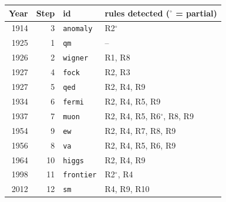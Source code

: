 \begin{tabular}{@{}rrlp{7cm}@{}}\toprule
Year & Step & id & rules detected ($^{\circ}$ = partial) \\\midrule
1914 & 3 & \texttt{anomaly} & R2$^{\circ}$ \\
1925 & 1 & \texttt{qm} & -- \\
1926 & 2 & \texttt{wigner} & R1, R8 \\
1927 & 4 & \texttt{fock} & R2, R3 \\
1927 & 5 & \texttt{qed} & R2, R4, R9 \\
1934 & 6 & \texttt{fermi} & R2, R4, R5, R9 \\
1937 & 7 & \texttt{muon} & R2, R4, R5, R6$^{\circ}$, R8, R9 \\
1954 & 9 & \texttt{ew} & R2, R4, R7, R8, R9 \\
1956 & 8 & \texttt{va} & R2, R4, R5, R6, R9 \\
1964 & 10 & \texttt{higgs} & R2, R4, R9 \\
1998 & 11 & \texttt{frontier} & R2$^{\circ}$, R4 \\
2012 & 12 & \texttt{sm} & R4, R9, R10 \\
\bottomrule\end{tabular}

